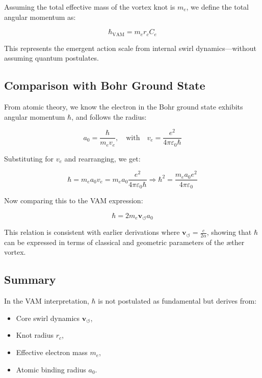\documentclass[12pt]{article}
\begin{document}
Assuming the total effective mass of the vortex knot is \( m_e \), we define the total angular momentum as:

\begin{equation}
    \hbar_{\text{VAM}} = m_e r_c C_e
\end{equation}

This represents the emergent action scale from internal swirl dynamics—without assuming quantum postulates.

\subsection{Comparison with Bohr Ground State}

From atomic theory, we know the electron in the Bohr ground state exhibits angular momentum \( \hbar \), and follows the radius:

\begin{equation}
    a_0 = \frac{\hbar}{m_e v_e}, \quad \text{with} \quad v_e = \frac{e^2}{4\pi \varepsilon_0 \hbar}
\end{equation}

Substituting for \( v_e \) and rearranging, we get:

\begin{equation}
    \hbar = m_e a_0 v_e = m_e a_0 \frac{e^2}{4\pi \varepsilon_0 \hbar} \Rightarrow \hbar^2 = \frac{m_e a_0 e^2}{4\pi \varepsilon_0}
\end{equation}

Now comparing this to the VAM expression:

\begin{equation}
    \boxed{\hbar = 2 m_e \mathbf{v}_{\scriptscriptstyle\boldsymbol{\circlearrowleft}} a_0}
\end{equation}

This relation is consistent with earlier derivations where \( \mathbf{v}_{\scriptscriptstyle\boldsymbol{\circlearrowleft}} = \frac{c}{2\alpha} \), showing that \( \hbar \) can be expressed in terms of classical and geometric parameters of the æther vortex.

\subsection*{Summary}

In the VAM interpretation, \( \hbar \) is not postulated as fundamental but derives from:

\begin{itemize}
    \item Core swirl dynamics \( \mathbf{v}_{\scriptscriptstyle\boldsymbol{\circlearrowleft}} \),
    \item Knot radius \( r_c \),
    \item Effective electron mass \( m_e \),
    \item Atomic binding radius \( a_0 \).
\end{itemize}
\end{document}
